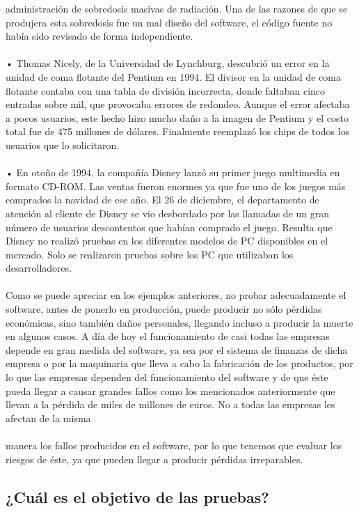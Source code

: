 \documentclass[12pt,letterpaper]{article}
\begin{document}
    administración de sobredosis masivas de radiación. Una de las razones de que se produjera esta sobredosis fue un mal diseño del software, el código fuente no había sido revisado de forma independiente.
    \\
    \\
    •	Thomas Nicely, de la Universidad de Lynchburg, descubrió un error en la unidad de coma flotante del Pentium en 1994. El divisor en la unidad de coma flotante contaba con una tabla de división incorrecta, donde faltaban cinco entradas sobre mil, que provocaba errores de redondeo. Aunque el error afectaba a pocos usuarios, este hecho hizo mucho daño a la imagen  de Pentium y el costo total fue de 475 millones de dólares. Finalmente reemplazó los chips de todos los usuarios que lo solicitaron.
    \\
    \\
    •	En otoño de 1994, la compañía Disney lanzó su primer juego multimedia  en formato CD-ROM. Las ventas fueron enormes ya que fue uno de los juegos más comprados la navidad de ese año. El 26 de diciembre, el departamento de atención al cliente de Disney se vio desbordado por las llamadas de un gran número de usuarios descontentos que habían comprado el juego. Resulta que Disney no realizó pruebas en los diferentes modelos de PC disponibles en el mercado. Solo se realizaron pruebas sobre los PC que utilizaban los desarrolladores.
    \\
    \\
    Como se puede apreciar en los ejemplos anteriores, no probar adecuadamente el software, antes de ponerlo en producción, puede producir no sólo pérdidas económicas, sino también daños personales, llegando incluso a producir la muerte en algunos casos.
    A día de hoy el funcionamiento de casi todas las empresas depende en gran medida del software, ya sea por el sistema de finanzas de dicha empresa o por la maquinaria que lleva a cabo la fabricación de los productos, por lo que las empresas dependen del funcionamiento del software y de que éste pueda llegar a causar grandes fallos como los mencionados anteriormente que llevan a la pérdida de miles de millones de euros. No a todas las empresas les afectan de la misma
    \\
    \\
    manera los fallos producidos en el software, por lo que tenemos que evaluar los riesgos de éste, ya que pueden llegar a producir pérdidas irreparables.


    \subsection{¿Cuál es el objetivo de las pruebas?}
\end{document}
